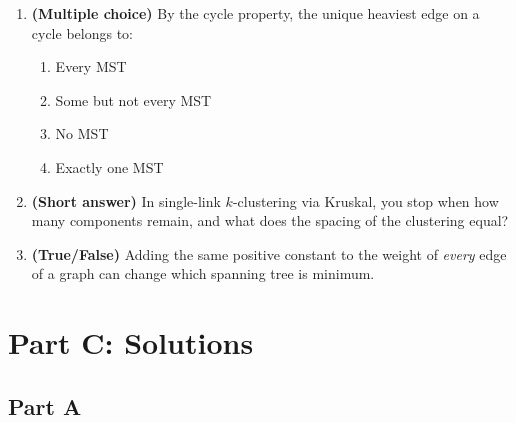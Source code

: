 \documentclass[11pt]{article}
\begin{document}
\begin{enumerate}[label=\textbf{B\arabic*.}, leftmargin=2.2em]
\item \textbf{(Multiple choice)} By the cycle property, the unique heaviest edge
on a cycle belongs to:
\begin{enumerate}[label=(\alph*)]
    \item Every MST
    \item Some but not every MST
    \item No MST
    \item Exactly one MST
\end{enumerate}

\item \textbf{(Short answer)} In single-link $k$-clustering via Kruskal, you stop
when how many components remain, and what does the spacing of the clustering
equal?

\item \textbf{(True/False)} Adding the same positive constant to the weight of
\emph{every} edge of a graph can change which spanning tree is minimum.

\end{enumerate}

\newpage
\section*{Part C: Solutions}

\subsection*{Part A}
\end{document}
